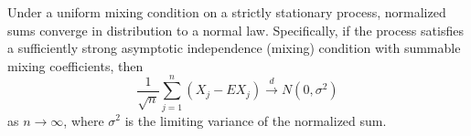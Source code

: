 Under a uniform mixing condition on a strictly stationary process, normalized sums converge in distribution to a normal law. Specifically, if the process satisfies a sufficiently strong asymptotic independence (mixing) condition with summable mixing coefficients, then
$$\frac{1}{\sqrt{n}} \sum_{j=1}^{n} (X_j - EX_j) \xrightarrow{d} N(0, \sigma^2)$$
as $n \to \infty$, where $\sigma^2$ is the limiting variance of the normalized sum.
